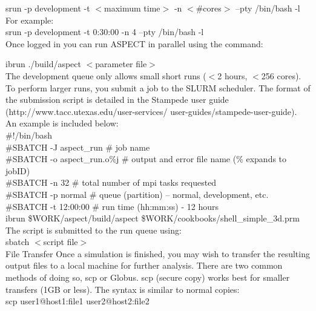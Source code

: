 \documentclass[11pt]{article}
\makeatletter
\renewcommand{\section}{\@startsection
  {section}{1}{0mm}{3mm}{0.5mm}{\bfseries\large}}
\makeatother
\begin{document}
srun -p development -t $<$maximum time$>$ -n $<$\#cores$>$ --pty /bin/bash -l \\

For example: \\
srun -p development -t 0:30:00 -n 4 --pty /bin/bash -l \\

Once logged in you can run ASPECT in parallel using the command:
 
 ibrun ./build/aspect $<$parameter file$>$ \\
 
 The development queue only allows small short runs ($<$2 hours, $<$256 cores). To perform larger runs, you submit a job to the SLURM scheduler. The format of the submission script is detailed in the Stampede user guide (http://www.tacc.utexas.edu/user-services/ user-guides/stampede-user-guide). An example is included below: \\
 
 
 \#!/bin/bash \\
\#SBATCH -J aspect\_run   \# job name \\
\#SBATCH -o aspect\_run.o\%j   \# output and error file name (\% expands to jobID) \\
\#SBATCH -n 32  \# total number of mpi tasks requested \\
\#SBATCH -p normal \# queue (partition) -- normal, development, etc. \\
\#SBATCH -t 12:00:00 \# run time (hh:mm:ss) - 12 hours \\
ibrun \$WORK/aspect/build/aspect \$WORK/cookbooks/shell\_simple\_3d.prm \\ 

The script is submitted to the run queue using: \\

sbatch $<$script file$>$ \\

\section{File Transfer}
Once a simulation is finished, you may wish to transfer the resulting output files to a local machine for further analysis. There are two common methods of doing so, scp or Globus. scp (secure copy) works best for smaller transfers (1GB or less). The syntax is similar to normal copies: \\

scp user1@host1:file1 user2@host2:file2 \\
\end{document}
